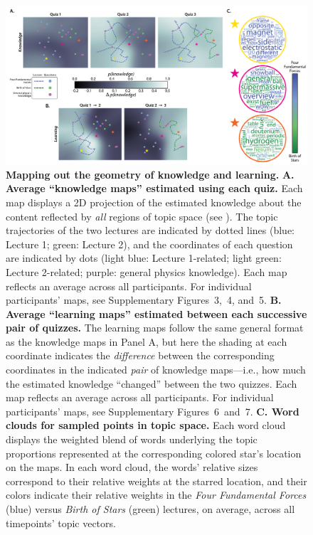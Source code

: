 \documentclass[10pt]{article}
\newcommand{\individualKnowledgeMapsA}{3}
\newcommand{\individualKnowledgeMapsB}{4}
\newcommand{\individualKnowledgeMapsC}{5}
\newcommand{\individualLearningMapsA}{6}
\newcommand{\individualLearningMapsB}{7}
\renewcommand{\nameref}[1]{\mbox{\textit{\oldnameref{#1}}}}
\begin{document}
\begin{figure}[tp]
    \centering
    \includegraphics[width=\textwidth]{figs/knowledge_and_learning_maps}

    \caption{\textbf{Mapping out the geometry of knowledge and learning.}
    \textbf{A. Average ``knowledge maps'' estimated using each quiz.} Each map
    displays a 2D projection of the estimated knowledge about the content
    reflected by \textit{all} regions of topic space (see
    \nameref{subsec:knowledge-maps}). The topic trajectories of the two
    lectures are indicated by dotted lines (blue: Lecture 1; green: Lecture 2),
    and the coordinates of each question are indicated by dots (light blue:
    Lecture 1-related; light green: Lecture 2-related; purple: general physics
    knowledge). Each map reflects an average across all participants. For
    individual participants' maps, see Supplementary
    Figures~\individualKnowledgeMapsA,~\individualKnowledgeMapsB,
    and~\individualKnowledgeMapsC. \textbf{B. Average ``learning maps''
    estimated between each successive pair of quizzes.} The learning maps
    follow the same general format as the knowledge maps in Panel A, but here
    the shading at each coordinate indicates the \textit{difference} between
    the corresponding coordinates in the indicated \textit{pair} of knowledge
    maps---i.e., how much the estimated knowledge ``changed'' between the two
    quizzes. Each map reflects an average across all participants. For
    individual participants' maps, see Supplementary
    Figures~\individualLearningMapsA~and~\individualLearningMapsB. \textbf{C.
    Word clouds for sampled points in topic space.} Each word cloud displays
    the weighted blend of words underlying the topic proportions represented at
    the corresponding colored star's location on the maps. In each word cloud,
    the words' relative sizes correspond to their relative weights at the
    starred location, and their colors indicate their relative weights in the
    \textit{Four Fundamental Forces} (blue) versus \textit{Birth of Stars}
    (green) lectures, on average, across all timepoints' topic vectors.}

    \label{fig:knowledge-maps}
    \end{figure}
\end{document}
